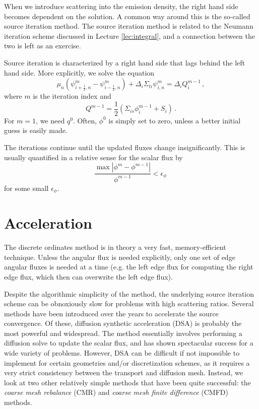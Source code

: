When we introduce scattering into the emission density, the right hand side becomes dependent on the solution.  A common way around this is the so-called source iteration method.  The source iteration method is related to the Neumann iteration scheme discussed in Lecture \ref{lec:integral}, and a connection between the two is left as an exercise.  

Source iteration is characterized by a right hand side that lags behind the left hand side.  More explicitly, we solve the equation
\begin{equation}
   \mu_n ( \psi^m_{i+\frac{1}{2},n} - \psi^m_{i-\frac{1}{2},n} ) + \Delta_i \Sigma_{ti}\psi^m_{i,n} =  \Delta_i Q^{m-1}_i \, ,
   \label{eq:discsneqsi}
\end{equation}
where $m$ is the iteration index and 
\begin{equation}
 Q^{m-1} = \frac{1}{2} (\Sigma_{is} \phi^{m-1}_i +  S_i) \, .
\end{equation}
For $m=1$, we need $q^0$.  Often, $\phi^0$ is simply set to zero, unless a better initial guess is easily made.  

The iterations continue until the updated fluxes change insignificantly.  This is usually quantified in a relative sense for the scalar flux by
\begin{equation}
 \frac{ \max | \phi^{m}-\phi^{m-1} |}{\phi^{m-1}}  < \epsilon_{\phi} \, 
 \label{eq:siconvergence}
\end{equation}
for some small $\epsilon_{\phi}$.

\section*{Acceleration}

The discrete ordinates method is in theory a very fast, memory-efficient technique.  Unless the angular flux is needed explicitly, only one set of edge angular fluxes is needed at a time (e.g. the left edge flux for computing the right edge flux, which then can overwrite the left edge flux).  

Despite the algorithmic simplicity of the method, the underlying source iteration scheme can be obnoxiously slow for problems with high scattering ratios.  Several methods have been introduced over the years to accelerate the source convergence.  Of these, diffusion synthetic acceleration (DSA) is probably the most powerful and widespread.  The method essentially involves performing a diffusion solve to update the scalar flux, and has shown spectacular success for a wide variety of problems.  However, DSA can be difficult if not impossible to implement for certain geometries and/or discretization schemes, as it requires a very strict consistency between the transport and diffusion mesh. Instead, we look at two other relatively simple methods that have been quite successful: the \textit{coarse mesh rebalance} (CMR) and \textit{coarse mesh finite difference} (CMFD) methods.

